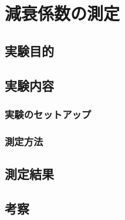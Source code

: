 \documentclass[titlepage]{ltjsarticle}
\begin{document}
\section{減衰係数の測定}

\subsection{実験目的}

\subsection{実験内容}
\subsubsection{実験のセットアップ}

\subsubsection{測定方法}



\subsection{測定結果}


\subsection{考察}
\end{document}
